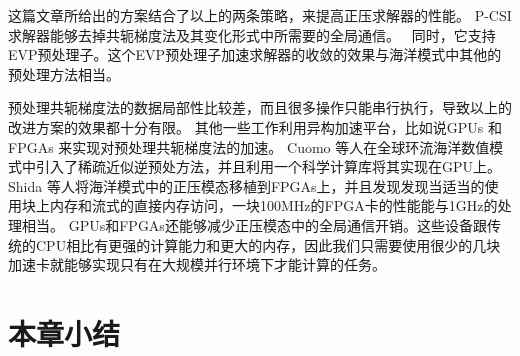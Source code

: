 这篇文章所给出的方案结合了以上的两条策略，来提高正压求解器的性能。 
P-CSI求解器能够去掉共轭梯度法及其变化形式中所需要的全局通信。　
同时，它支持EVP预处理子。这个EVP预处理子加速求解器的收敛的效果与海洋模式中其他的预处理方法相当。 



预处理共轭梯度法的数据局部性比较差，而且很多操作只能串行执行，导致以上的改进方案的效果都十分有限。 
其他一些工作利用异构加速平台，比如说GPUs \cite{cuomo2012pcg} 和FPGAs \cite{Shida2007}来实现对预处理共轭梯度法的加速。 
Cuomo 等人\cite{cuomo2012pcg}在全球环流海洋数值模式中引入了稀疏近似逆预处方法，并且利用一个科学计算库将其实现在GPU上。 
Shida 等人\cite{Shida2007}将海洋模式中的正压模态移植到FPGAs上，并且发现发现当适当的使用块上内存和流式的直接内存访问，一块100MHz的FPGA卡的性能能与1GHz的处理相当。 
GPUs和FPGAs还能够减少正压模态中的全局通信开销。这些设备跟传统的CPU相比有更强的计算能力和更大的内存，因此我们只需要使用很少的几块加速卡就能够实现只有在大规模并行环境下才能计算的任务。


\section{本章小结}
\label{related:Conclude}
